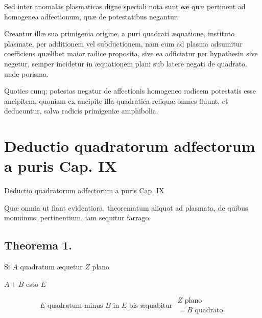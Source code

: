 \documentclass[11pt,a4paper]{article}
\begin{document}

Sed  inter anomalas plasmaticas digne speciali nota sunt eæ quæ \struck{\ill{}} pertinent ad homogenea adfectionum, quæ de potestatibus negantur.

Creantur illæ sua primigenia origine, a puri quadrati æquatione, instituto plasmate, per additionem vel subductionem, nam cum ad plasma adsumitur coefficiens quælibet maior radice proposita, sive ea adficiatur per hypothesin sive negetur, semper incidetur in æquationem plani sub latere negati de quadrato. unde porisma.

Quoties cunq; potestas negatur de affectionis homogeneo radicem potestatis esse ancipitem, quoniam ex ancipite illa quadratica reliquæ omnes fluunt, et deducuntur, salva radicis primigeniæ amphibolia.

\section*{Deductio quadratorum adfectorum a puris Cap. IX}

Deductio quadratorum adfectorum a puris Cap.  IX

Quæ omnia ut fiant evidentiora, theorematum aliquot ad plasmata, de quibus monuimus, pertinentium, iam sequitur farrago.

\subsection*{Theorema 1.}

Si $A$ quadratum æquetur $Z$ plano

$A + B$ esto $E$

\[ E \text{ quadratum minus } B \text{ in } E \text{ bis æquabitur } \begin{array}{l} Z \text{ plano} \\ = B \text{ quadrato} \end{array} \]
\end{document}
